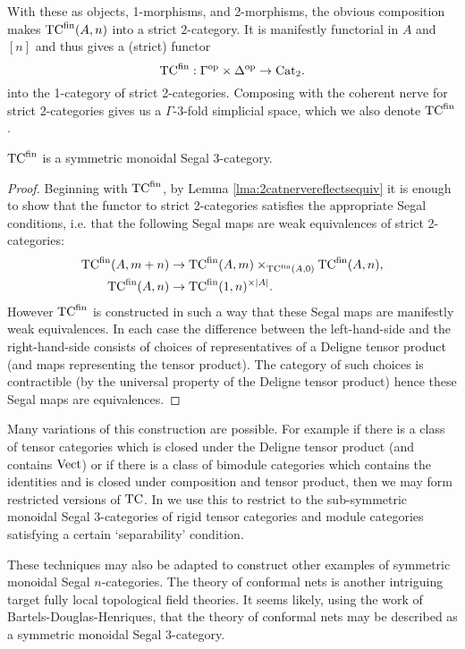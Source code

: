 \documentclass{amsart}
\begin{document}
With these as objects, 1-morphisms, and 2-morphisms, the obvious composition makes ${\mathrm{TC}^{\text{fin}}}(A,n)$ into a strict $2$-category. It is manifestly functorial in $A$ and $[n]$ and thus gives a (strict) functor 
\begin{equation*}
	{\mathrm{TC}^{\text{fin}}}: \Gamma^\textrm{op} \times \Delta^\textrm{op} \to \mathrm{Cat}_2.
\end{equation*}
into the 1-category of strict 2-categories. Composing with the coherent nerve for strict 2-categories gives us a $\Gamma$-3-fold simplicial space, which we also denote ${\mathrm{TC}^{\text{fin}}}$. 

\begin{theorem}
	 ${\mathrm{TC}^{\text{fin}}}$ is a symmetric monoidal Segal 3-category.  
\end{theorem}
\begin{proof}
	Beginning with ${\mathrm{TC}^{\text{fin}}}$,
	by Lemma \ref{lma:2catnervereflectsequiv} it is enough to show that the functor to strict 2-categories satisfies the appropriate Segal conditions, i.e. that the following Segal maps are weak equivalences of strict 2-categories:
	\begin{align*}
		{\mathrm{TC}^{\text{fin}}}(A, m + n) & \to {\mathrm{TC}^{\text{fin}}}(A, m) \times_{{\mathrm{TC}^{\text{fin}}}(A, 0)} {\mathrm{TC}^{\text{fin}}}(A, n), \\
		{\mathrm{TC}^{\text{fin}}}(A, n) & \to {\mathrm{TC}^{\text{fin}}}(1, n)^{\times |A|}. 
	\end{align*}
However ${\mathrm{TC}^{\text{fin}}}$ is constructed in such a way that these Segal maps are manifestly weak equivalences. In each case the difference between the left-hand-side and the right-hand-side consists of choices of representatives of a Deligne tensor product (and maps representing the tensor product). The category of such choices is contractible (by the universal property of the Deligne tensor product) hence these Segal maps are equivalences. 
\end{proof}

Many variations of this construction are possible. For example if there is a class of tensor categories which is closed under the Deligne tensor product (and contains $\mathrm{Vect}$) or if there is a class of bimodule categories which contains the identities and is closed under composition and tensor product, then we may form restricted versions of $\mathrm{TC}$. In \cite{DSPS} we use this to restrict to the sub-symmetric monoidal Segal 3-categories of rigid tensor categories and module categories satisfying a certain `separability' condition. 

These techniques may also be adapted to construct other examples of symmetric monoidal Segal $n$-categories. The theory of conformal nets \cite{0912.5307} is another intriguing target fully local topological field theories. It seems likely, using the work of Bartels-Douglas-Henriques, that the theory of conformal nets may be described as a symmetric monoidal Segal 3-category. 
\end{document}
